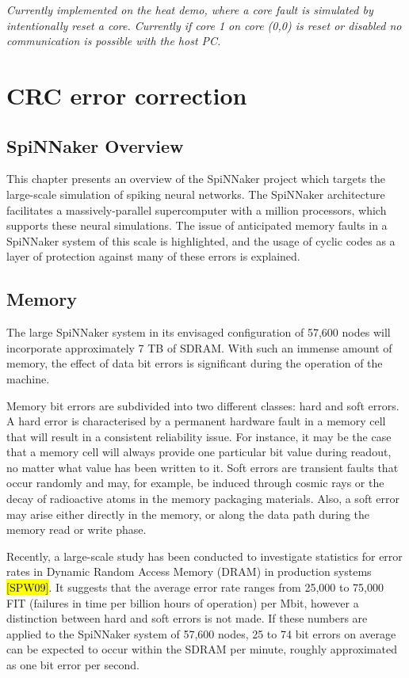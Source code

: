 \documentclass[a4paper, 11pt]{article}
\begin{document}
\emph{Currently implemented on the heat demo, where a core fault is simulated by intentionally reset a core. Currently if core 1 on core (0,0) is reset or disabled no communication is possible with the host PC.}


\clearpage
\section{CRC error correction}
\label{sec:crc}

\subsection{SpiNNaker Overview}
This chapter presents an overview of the SpiNNaker project which targets the large-scale simulation of spiking neural networks. The SpiNNaker architecture facilitates a massively-parallel supercomputer with a million processors, which supports these neural simulations. The issue of anticipated memory faults in a SpiNNaker system of this scale is highlighted, and the usage of cyclic codes as a layer of protection against many of these errors is explained.

\subsection{Memory}
The large SpiNNaker system in its envisaged configuration of 57,600 nodes will incorporate approximately 7 TB of SDRAM. With such an immense amount of memory, the effect of data bit errors is significant during the operation of the machine.

Memory bit errors are subdivided into two different classes: hard and soft errors. A hard error is characterised by a permanent hardware fault in a memory cell that will result in a consistent reliability issue. For instance, it may be the case that a memory cell will always provide one particular bit value during readout, no matter what value has been written to it. Soft errors are transient faults that occur randomly and may, for example, be induced through cosmic rays or the decay of radioactive atoms in the memory packaging materials. Also, a soft error may arise either directly in the memory, or along the data path during the memory read or write phase.

Recently, a large-scale study has been conducted to investigate statistics for error rates in Dynamic Random Access Memory (DRAM) in production systems \hl{[SPW09]}. It suggests that the average error rate ranges from 25,000 to 75,000 FIT (failures in time per billion hours of operation) per Mbit, however a distinction between hard and soft errors is not made. If these numbers are applied to the SpiNNaker system of 57,600 nodes, 25 to 74 bit errors on average can be expected to occur within the SDRAM per minute, roughly approximated as one bit error per second.
\end{document}
